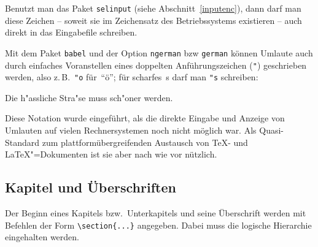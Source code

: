 Benutzt man das Paket \texttt{selinput} (siehe Abschnitt~\vref{inputenc}),
dann darf man diese Zeichen -- soweit sie im Zeichensatz des Betriebssystems
existieren -- auch direkt in das Eingabefile schreiben.

Mit dem Paket \texttt{babel} und der Option \texttt{ngerman} bzw \texttt{german}
können
Umlaute auch durch einfaches Voranstellen eines doppelten Anführungszeichen (\verb|"|) geschrieben werden,
also z.\,B.\ \lstinline|"o| für~"`ö"';
für scharfes~s darf man \lstinline|"s| schreiben:

\begin{LTXexample}
Die h"assliche Stra"se
muss sch"oner werden.
\end{LTXexample}

Diese Notation wurde eingeführt, als die direkte Eingabe und
Anzeige von Umlauten auf vielen Rechnersystemen noch nicht möglich war.
Als Quasi-Standard zum plattformübergreifenden Austausch von
\TeX- und \LaTeX"=Dokumenten ist sie aber nach wie vor nützlich.

\subsection{Kapitel und Überschriften}

Der Beginn eines Kapitels bzw.\ Unterkapitels und seine
Überschrift werden mit Befehlen der Form \lstinline|\section{...}|
angegeben. Dabei muss die logische Hierarchie eingehalten werden.

